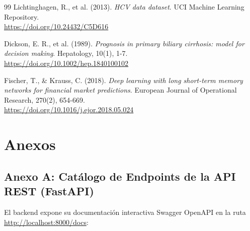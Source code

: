 \documentclass[12pt,letterpaper]{article}
\begin{document}
\begin{thebibliography}{99}
Lichtinghagen, R., et al. (2013). 
\textit{HCV data dataset}. 
UCI Machine Learning Repository. \\
\url{https://doi.org/10.24432/C5D616}

Dickson, E. R., et al. (1989). 
\textit{Prognosis in primary biliary cirrhosis: model for decision making}. 
Hepatology, 10(1), 1-7. \\
\url{https://doi.org/10.1002/hep.1840100102}

Fischer, T., \& Krauss, C. (2018). 
\textit{Deep learning with long short-term memory networks for financial market predictions}. 
European Journal of Operational Research, 270(2), 654-669. \\
\url{https://doi.org/10.1016/j.ejor.2018.05.024}

\end{thebibliography}

\newpage
\section{Anexos}

\subsection{Anexo A: Catálogo de Endpoints de la API REST (FastAPI)}
El backend expone su documentación interactiva Swagger OpenAPI en la ruta \url{http://localhost:8000/docs}:
\end{document}
